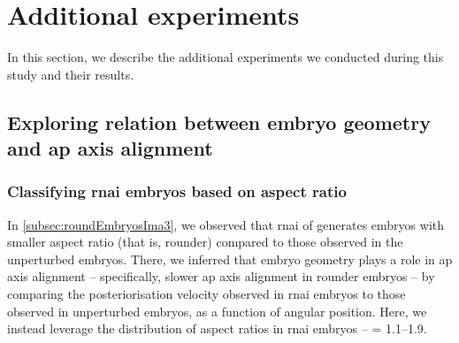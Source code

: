 \section{Additional experiments}\label{sec:additionalExp}
In this section, we describe the additional experiments we conducted during this study and their results.

\subsection{Exploring relation between embryo geometry and \acs{ap} axis alignment}\label{sec:moreRounderEmbryosDpy11Ima3}

\subsubsection{Classifying  \ac{rnai} embryos based on aspect ratio}\label{subsubsec:splitByAspectRatios}
In \autoref{subsec:roundEmbryosIma3}, we observed that \ac{rnai} of  generates embryos with smaller aspect ratio (that is, rounder) compared to those observed in the unperturbed embryos. There, we inferred that embryo geometry plays a role in \ac{ap} axis alignment -- specifically, slower \ac{ap} axis alignment in rounder embryos -- by comparing the posteriorisation velocity observed in  \ac{rnai} embryos to those observed in unperturbed embryos, as a function of angular position. Here, we instead leverage the distribution of aspect ratios in  \ac{rnai} embryos -- \aspectRatio = \numrange{1.1}{1.9}. 

